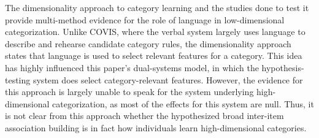 \documentclass[../dissertation.tex]{subfiles}
\begin{document}
	The dimensionality approach to category learning and the studies done to test it provide multi-method evidence for the role of language in low-dimensional categorization. Unlike COVIS, where the verbal system largely uses language to describe and rehearse candidate category rules, the dimensionality approach states that language is used to select relevant features for a category. This idea has highly influenced this paper's dual-systems model, in which the hypothesis-testing system does select category-relevant features. However, the evidence for this approach is largely unable to speak for the system underlying high-dimensional categorization, as most of the effects for this system are null. Thus, it is not clear from this approach whether the hypothesized broad inter-item association building is in fact how individuals learn high-dimensional categories.
\end{document}
